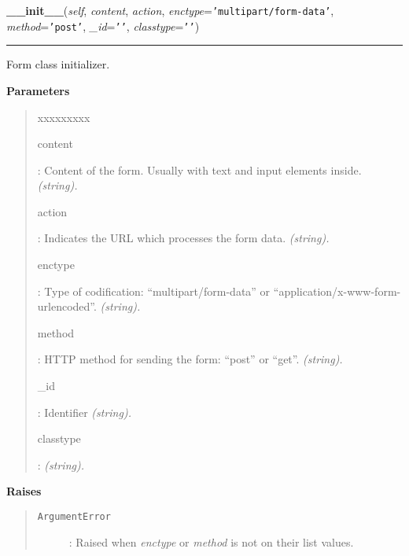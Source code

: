 \hspace{.8\funcindent}\begin{boxedminipage}{\funcwidth}

    \raggedright \textbf{\_\_init\_\_}(\textit{self}, \textit{content}, \textit{action}, \textit{enctype}={\tt \texttt{'}\texttt{multipart/form-data}\texttt{'}}, \textit{method}={\tt \texttt{'}\texttt{post}\texttt{'}}, \textit{\_id}={\tt \texttt{'}\texttt{}\texttt{'}}, \textit{classtype}={\tt \texttt{'}\texttt{}\texttt{'}})

    \vspace{-1.5ex}

    \rule{\textwidth}{0.5\fboxrule}
\setlength{\parskip}{2ex}

Form class initializer.
%
\begin{quote}

\end{quote}
\setlength{\parskip}{1ex}
      \textbf{Parameters}
      \vspace{-1ex}

      \begin{quote}
        \begin{Ventry}{xxxxxxxxx}

          \item[content]


:    Content of the form. Usually with text and input elements inside. \emph{(string).}
          \item[action]


:             Indicates the URL which processes the form data. \emph{(string).}
          \item[enctype]


:    Type of codification: ``multipart/form-data'' or ``application/x-www-form-urlencoded''. \emph{(string).}
          \item[method]


:             HTTP method for sending the form: ``post'' or ``get''. \emph{(string).}
          \item[\_id]


:                Identifier \emph{(string).}
          \item[classtype]


:  \emph{(string).}
        \end{Ventry}

      \end{quote}

      \textbf{Raises}
    \vspace{-1ex}

      \begin{quote}
        \begin{description}

          \item[\texttt{ArgumentError}]


: Raised when \emph{enctype} or \emph{method} is not on their list values.
        \end{description}

      \end{quote}

    \end{boxedminipage}

